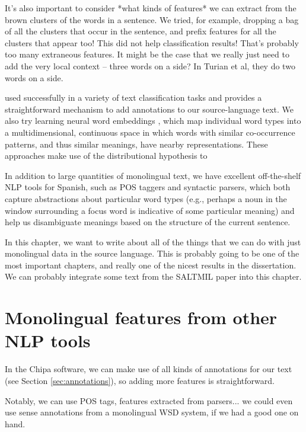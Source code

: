 It's also important to consider *what kinds of features* we can extract from
the brown clusters of the words in a sentence. We tried, for example, dropping
a bag of all the clusters that occur in the sentence, and prefix features for
all the clusters that appear too! This did not help classification results!
That's probably too many extraneous features.
It might be the case that we really just need to add the very local context --
three words on a side? In Turian et al, they do two words on a side.


used successfully in a variety of text classification tasks
and provides a straightforward mechanism
to add annotations to our source-language text.  We also try learning neural
word embeddings \cite{mikolovword2vec}, which map individual word types into a
multidimensional, continuous space in which words with similar co-occurrence
patterns, and thus similar meanings, have nearby representations.
These approaches make use of the distributional hypothesis to 


In addition to large quantities of monolingual text, we have excellent
off-the-shelf NLP tools for Spanish, such as POS taggers and syntactic parsers,
which both capture abstractions about particular word types (e.g., perhaps a
noun in the window surrounding a focus word is indicative of some particular
meaning) and help us disambiguate meanings based on the structure of the
current sentence.


In this chapter, we want to write about all of the things that we can do with
just monolingual data in the source language.
This is probably going to be one of the most important chapters, and really one
of the nicest results in the dissertation.
We can probably integrate some text from the SALTMIL paper into this chapter.


\section{Monolingual features from other NLP tools}
In the Chipa software, we can make use of all kinds of annotations for our
text (see Section \ref{sec:annotations}), so adding more features is
straightforward.

Notably, we can use POS tags, features extracted from parsers... we could even
use sense annotations from a monolingual WSD system, if we had a good one on
hand.

